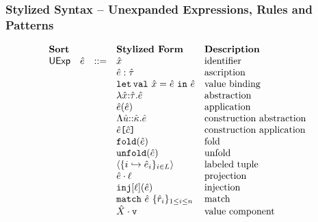 \clearpage

\subsubsection{Stylized Syntax -- Unexpanded Expressions, Rules and Patterns}
\[\begin{array}{lllllll}
\textbf{Sort} & & 
& \textbf{Stylized Form} & \textbf{Description}\\
\mathsf{UExp} & {\hat e} & ::= 
& {\hat x} & \text{identifier}\\
&&
& {\hat e} : {\hat\tau} & \text{ascription}\\
&&
& \texttt{let\,val}~{\hat x}={\hat e}~\texttt{in}~{\hat e} & \text{value binding}\\
&&
& \lambda {\hat x}{:}{\hat\tau}.{\hat e} & \text{abstraction}\\
&&
& {\hat e}({\hat e}) & \text{application}\\
&&
& \Lambda {\hat u}{::}{\hat\kappa}.{\hat e} & \text{construction abstraction}\\
&&
& {\hat e}\texttt{[}{\hat c}\texttt{]} & \text{construction application}\\
&&
& \texttt{fold}({\hat e}) & \text{fold}\\
&&
& \texttt{unfold}({\hat e}) & \text{unfold}\\
&&
& \langle \{i \hookrightarrow {\hat e}_{i}\}_{i \in L}\rangle & \text{labeled tuple}\\
&&
& {\hat e} \cdot \ell & \text{projection}\\
&&
& \texttt{inj}[\ell]({\hat e}) & \text{injection}\\
&&
& \texttt{match}~{\hat e}~\{\hat{r}_{i}\}_{1 \leq i \leq n} & \text{match}\\
&&
& {\hat X} \cdot \texttt{v} & \text{value component}\\

\end{array}\]
